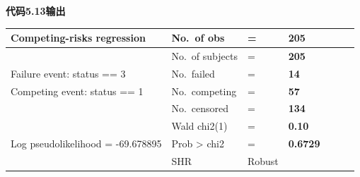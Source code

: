 \documentclass[
  chinese-hans,
  letterpaper,
  DIV=11,
  numbers=noendperiod]{scrreprt}
\newcounter{none} %
\begin{document}
\begin{tcolorbox}[enhanced jigsaw, arc=.35mm, bottomrule=.15mm, breakable, colback=white, colframe=quarto-callout-note-color-frame, left=2mm, leftrule=.75mm, opacityback=0, rightrule=.15mm, toprule=.15mm]

\vspace{-3mm}\textbf{代码5.13输出}\vspace{3mm}

{\def\LTcaptype{none} %
\begin{longtable}[]{@{}
  >{\raggedright\arraybackslash}p{}
  >{\raggedright\arraybackslash}p{}
  >{\raggedright\arraybackslash}p{}
  >{\raggedright\arraybackslash}p{}
  >{\raggedright\arraybackslash}p{}
  >{\raggedright\arraybackslash}p{}
  >{\raggedright\arraybackslash}p{}@{}}
\toprule\noalign{}
\begin{minipage}[b]{\linewidth}\raggedright
Competing-risks regression
\end{minipage} & \begin{minipage}[b]{\linewidth}\raggedright
No.~of obs
\end{minipage} & \begin{minipage}[b]{\linewidth}\raggedright
=
\end{minipage} & \begin{minipage}[b]{\linewidth}\raggedright
\textbf{205}
\end{minipage} & \begin{minipage}[b]{\linewidth}\raggedright
\end{minipage} & \begin{minipage}[b]{\linewidth}\raggedright
\end{minipage} & \begin{minipage}[b]{\linewidth}\raggedright
\end{minipage} \\
\midrule\noalign{}
\endhead
\bottomrule\noalign{}
\endlastfoot
& No.~of subjects & = & \textbf{205} & & & \\
Failure event: status == 3 & No.~failed & = & \textbf{14} & & & \\
Competing event: status == 1 & No.~competing & = & \textbf{57} & & & \\
& No.~censored & = & \textbf{134} & & & \\
& Wald chi2(1) & = & \textbf{0.10} & & & \\
Log pseudolikelihood = -69.678895 & Prob \textgreater{} chi2 & = &
\textbf{0.6729} & & & \\
& SHR & Robust


\end{longtable}}
\end{tcolorbox}
\end{document}
